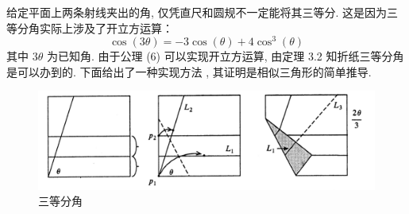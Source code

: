 给定平面上两条射线夹出的角, 仅凭直尺和圆规不一定能将其三等分. 
这是因为三等分角实际上涉及了开立方运算：
$$
\cos(3\theta)=-3\cos(\theta)+4\cos^3(\theta)
$$
其中 $3\theta$ 为已知角. 由于公理 (6) 可以实现开立方运算, 
由定理 3.2 知折纸三等分角是可以办到的. 
下面给出了一种实现方法 \cite{Hul}, 其证明是相似三角形的简单推导. 

\begin{figure}[h]
    \centering
    \includegraphics[scale=0.4]{trisect.png}
    \caption{三等分角}
\end{figure}